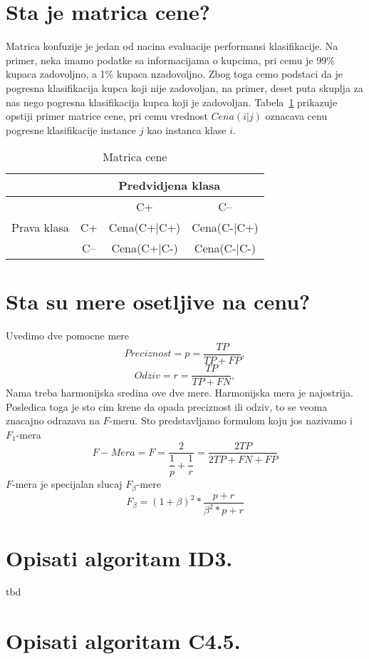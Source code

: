 \documentclass[a4paper]{article}
\begin{document}
\section{Sta je matrica cene?}
Matrica konfuzije je jedan od nacina evaluacije performansi klasifikacije. Na primer, neka imamo
podatke sa informacijama o kupcima, pri cemu je 99\% kupaca zadovoljno, a 1\% kupaca nzadovoljno.
Zbog toga cemo podstaci da je pogresna klasifikacija kupca koji nije zadovoljan, na primer, deset
puta skuplja za nas nego pogresna klasifikacija kupca koji je zadovoljan. Tabela~\ref{matrica_cene}
prikazuje opstiji primer matrice cene, pri cemu vrednost \(Cena(i|j)\) oznacava cenu pogresne
klasifikacije instance \(j\) kao instanca klase \(i\).
\begin{table}[htbp]
\centering
\begin{tabular}{|c|c|c|c|}
    \hline
    & \multicolumn{3}{|c|}{Predvidjena klasa} \\ \hline
    \multirow{ 3}{*}{Prava klasa} & & C+ & C-- \\ 
    & C+ & Cena(C+|C+) & Cena(C-|C+) \\ 
    & C-- & Cena(C+|C-) & Cena(C-|C-)\\ \hline
\end{tabular}
\caption{Matrica cene}
\label{matrica_cene}
\end{table}

\section{Sta su mere osetljive na cenu?}
Uvedimo dve pomocne mere
\[
    Preciznost = p = \dfrac{TP}{TP+FP},
\]
\[
    Odziv = r = \dfrac{TP}{TP+FN},
\]
Nama treba harmonijska sredina ove dve mere. Harmonijska mera je najostrija. Posledica toga je sto
cim krene da opada preciznost ili odziv, to se veoma znacajno odrazava na \(F\)-meru. Sto
predstavljamo formulom koju jos nazivamo i \(F_1\)-mera
\[
    F-Mera = F = \dfrac{2}{\dfrac{1}{p}+\dfrac{1}{r}} = \dfrac{2TP}{2TP + FN + FP}
\]
\(F\)-mera je specijalan slucaj \(F_{\beta}\)-mere
\[
    F_{\beta} = (1+\beta)^2 * \dfrac{p+r}{\beta^2*p + r}
\]

\section{Opisati algoritam ID3.}
tbd
\section{Opisati algoritam C4.5.}
\end{document}

